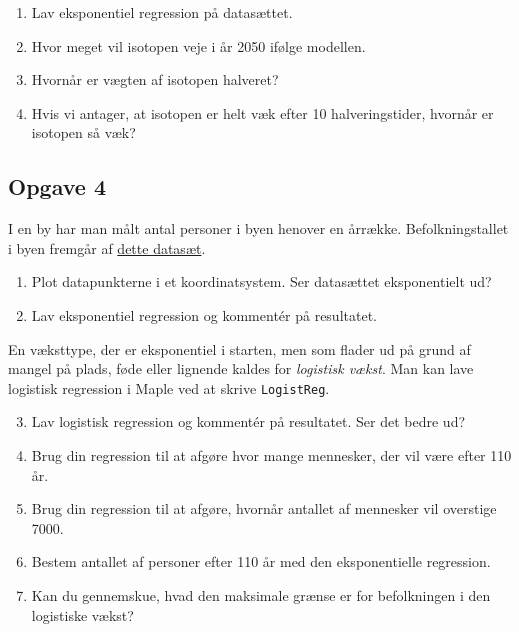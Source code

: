 \begin{enumerate}[label=\roman*)]
	\item Lav eksponentiel regression på datasættet.
	\item Hvor meget vil isotopen veje i år 2050 ifølge modellen.
	\item Hvornår er vægten af isotopen halveret?
	\item Hvis vi antager, at isotopen er helt væk efter 10 halveringstider, hvornår er isotopen så væk?
\end{enumerate}

\subsection*{Opgave 4}

I en by har man målt antal personer i byen henover en årrække. Befolkningstallet i byen fremgår af \href{https://github.com/ChristianJLex/TeachingNotes/raw/master/2023-2024/Data%20og%20lign/befolkningibylogist.xlsx}{\color{blue!60} dette datasæt}.

\begin{enumerate}[label=\roman*)]
	\item Plot datapunkterne i et koordinatsystem. Ser datasættet eksponentielt ud?
	\item Lav eksponentiel regression og kommentér på resultatet. 
\end{enumerate}
En væksttype, der er eksponentiel i starten, men som flader ud på grund af mangel på plads, føde eller lignende kaldes for \textit{logistisk vækst}. Man kan lave logistisk regression i Maple ved at skrive \texttt{LogistReg}.

\begin{enumerate}[label=\roman*)]
	\setcounter{enumi}{2}
	\item Lav logistisk regression og kommentér på resultatet. Ser det bedre ud?
	\item Brug din regression til at afgøre hvor mange mennesker, der vil være efter 110 år.
	\item Brug din regression til at afgøre, hvornår antallet af mennesker vil overstige 7000.
	\item Bestem antallet af personer efter 110 år med den eksponentielle regression. 
	\item Kan du gennemskue, hvad den maksimale grænse er for befolkningen i den logistiske vækst?
\end{enumerate}
